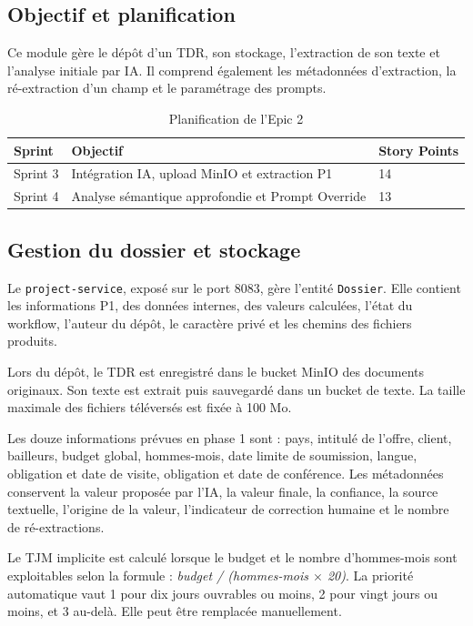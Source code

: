 \subsection{Objectif et planification}

Ce module gère le dépôt d’un TDR, son stockage, l’extraction de son texte et l’analyse initiale par IA. Il comprend également les métadonnées d’extraction, la ré-extraction d’un champ et le paramétrage des prompts.

\begin{table}[H]
\centering
\caption{Planification de l’Epic 2}
\begin{tabular}{lll}
\toprule
\textbf{Sprint} & \textbf{Objectif} & \textbf{Story Points} \\
\midrule
Sprint 3 & Intégration IA, upload MinIO et extraction P1 & 14 \\
Sprint 4 & Analyse sémantique approfondie et Prompt Override & 13 \\
\bottomrule
\end{tabular}
\end{table}

\subsection{Gestion du dossier et stockage}

Le \texttt{project-service}, exposé sur le port 8083, gère l’entité \texttt{Dossier}. Elle contient les informations P1, des données internes, des valeurs calculées, l’état du workflow, l’auteur du dépôt, le caractère privé et les chemins des fichiers produits.

Lors du dépôt, le TDR est enregistré dans le bucket MinIO des documents originaux. Son texte est extrait puis sauvegardé dans un bucket de texte. La taille maximale des fichiers téléversés est fixée à 100 Mo.

Les douze informations prévues en phase 1 sont : pays, intitulé de l’offre, client, bailleurs, budget global, hommes-mois, date limite de soumission, langue, obligation et date de visite, obligation et date de conférence. Les métadonnées conservent la valeur proposée par l’IA, la valeur finale, la confiance, la source textuelle, l’origine de la valeur, l’indicateur de correction humaine et le nombre de ré-extractions.

Le TJM implicite est calculé lorsque le budget et le nombre d’hommes-mois sont exploitables selon la formule : \textit{budget / (hommes-mois $\times$ 20)}. La priorité automatique vaut 1 pour dix jours ouvrables ou moins, 2 pour vingt jours ou moins, et 3 au-delà. Elle peut être remplacée manuellement.


